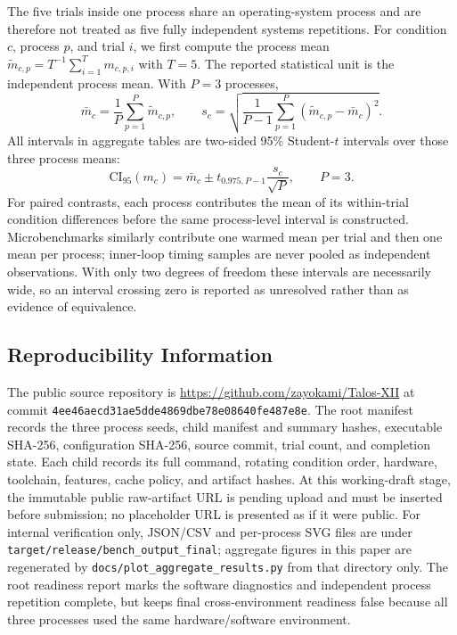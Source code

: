\documentclass{article}
\begin{document}
The five trials inside one process share an operating-system process and are
therefore not treated as five fully independent systems repetitions. For
condition $c$, process $p$, and trial $i$, we first compute the process mean
$\widetilde m_{c,p}=T^{-1}\sum_{i=1}^{T}m_{c,p,i}$ with $T=5$. The reported
statistical unit is the independent process mean. With $P=3$ processes,
\begin{equation}
\bar{m}_c=\frac{1}{P}\sum_{p=1}^{P}\widetilde m_{c,p},
\qquad
s_c=\sqrt{\frac{1}{P-1}\sum_{p=1}^{P}
(\widetilde m_{c,p}-\bar{m}_c)^2}.
\label{eq:metric-mean-std}
\end{equation}
All intervals in aggregate tables are two-sided 95\% Student-$t$ intervals
over those three process means:
\begin{equation}
\mathrm{CI}_{95}(m_c)
=
\bar{m}_c
\pm
t_{0.975,P-1}\frac{s_c}{\sqrt{P}},
\qquad P=3.
\label{eq:metric-ci}
\end{equation}
For paired contrasts, each process contributes the mean of its within-trial
condition differences before the same process-level interval is constructed.
Microbenchmarks similarly contribute one warmed mean per trial and then one
mean per process; inner-loop timing samples are never pooled as independent
observations. With only two degrees of freedom these intervals are necessarily
wide, so an interval crossing zero is reported as unresolved rather than as
evidence of equivalence.

\subsection{Reproducibility Information}

The public source repository is
\url{https://github.com/zayokami/Talos-XII} at commit
\texttt{4ee46aecd31ae5dde4869dbe78e08640fe487e8e}.
The root manifest records the three process seeds, child manifest and summary
hashes, executable SHA-256, configuration SHA-256, source commit, trial count,
and completion state. Each child records its full command, rotating condition
order, hardware, toolchain, features, cache policy, and artifact hashes. At
this working-draft stage, the immutable public raw-artifact URL is pending
upload and must be inserted before submission; no placeholder URL is presented
as if it were public. For internal verification only, JSON/CSV and per-process
SVG files are under \texttt{target/release/bench\_output\_final}; aggregate
figures in this paper
are regenerated by \texttt{docs/plot\_aggregate\_results.py} from that directory
only. The root readiness report marks the software diagnostics and independent
process repetition complete, but keeps final cross-environment readiness false
because all three processes used the same hardware/software environment.
\end{document}
